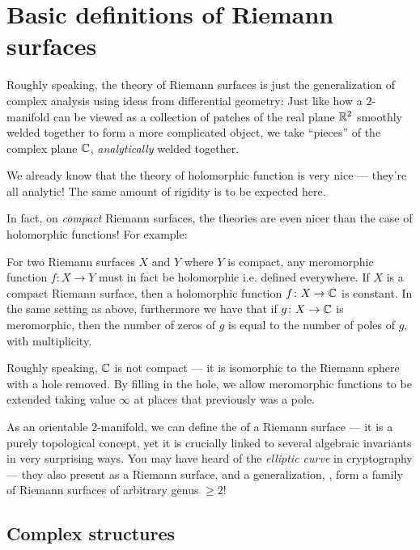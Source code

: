 \chapter{Basic definitions of Riemann surfaces}
\label{ch:complex_structure_def}

Roughly speaking, the theory of Riemann surfaces is just the generalization of complex analysis
using ideas from differential geometry:
Just like how a $2$-manifold can be viewed as a collection of patches of the real plane $\mathbb R^2$
smoothly welded together to form a more complicated object,
we take ``pieces'' of the complex plane $\mathbb C$, \emph{analytically} welded together.

We already know that the theory of holomorphic function is very nice --- they're all analytic!
The same amount of rigidity is to be expected here.

In fact, on \emph{compact} Riemann surfaces, the theories are even nicer than the case of
holomorphic functions! For example:
\begin{itemize}
	\ii For two Riemann surfaces $X$ and $Y$ where $Y$ is compact, any meromorphic function $f
	\colon X \to Y$ must in fact be holomorphic i.e. defined everywhere.
	\ii If $X$ is a compact Riemann surface, then a holomorphic function $f \colon X \to \mathbb C$ is
	constant.
	\ii In the same setting as above, furthermore we have that if $g \colon X \to \mathbb C$ is
	meromorphic, then the number of zeros of $g$ is equal to the number of poles of $g$, with
	multiplicity.
\end{itemize}

\begin{remark}
Roughly speaking, $\mathbb C$ is not compact --- it is isomorphic to the Riemann sphere with a hole
removed. By filling in the hole, we allow meromorphic functions to be extended taking value $\infty$
at places that previously was a pole.
\end{remark}

As an orientable $2$-manifold, we can define the  of a Riemann surface --- it is a
purely topological concept, yet it is crucially linked to several algebraic invariants
in very surprising ways.
You may have heard of the \emph{elliptic curve} in cryptography --- they also present as a Riemann
surface, and a generalization, , form a family of Riemann surfaces of
arbitrary genus $\geq 2$!

\section{Complex structures}

